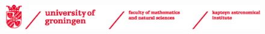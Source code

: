 


\newpage

\null

\pagebreak


\newpage

\begin{figure}[htbp!]
  \centering
  \includegraphics[width=\textwidth]{ch_frontandback/img/RUG_FWN_KAPTEYN_logoEN_pms186.eps}
\end{figure}

